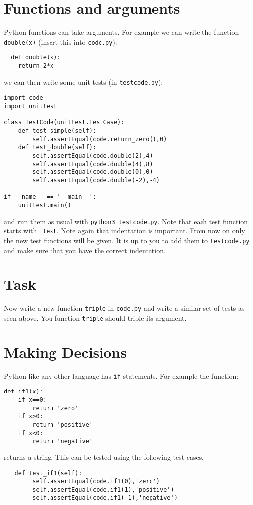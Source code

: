 \documentclass{paper}
\begin{document}
\section*{Functions and arguments}
Python functions can take arguments. For example we can write the
function {\tt double(x)} (insert this into {\tt code.py}):
\begin{lstlisting}
  def double(x):
    return 2*x
\end{lstlisting}
we can then write some unit tests (in {\tt testcode.py}):
\begin{lstlisting}
import code
import unittest

class TestCode(unittest.TestCase):
    def test_simple(self):
        self.assertEqual(code.return_zero(),0)
    def test_double(self):
        self.assertEqual(code.double(2),4)
        self.assertEqual(code.double(4),8)
        self.assertEqual(code.double(0),0)
        self.assertEqual(code.double(-2),-4)

if __name__ == '__main__':
    unittest.main()

  \end{lstlisting} and run them as usual with {\tt python3
    testcode.py}. Note that each test function starts with {\tt
    test}. Note again that indentation is important. From now on only
  the new test functions will be given. It is up to you to add them to
  {\tt testcode.py} and make sure that you have the correct
  indentation.

\section{Task}
Now write a new function {\tt triple} in {\tt code.py} and write a
similar set of tests as seen above. You function {\tt triple} should triple
its argument.

\section*{Making Decisions}
Python like any other language has {\tt if} statements. For example
the function:
\begin{lstlisting}
def if1(x):
    if x==0:
        return 'zero'
    if x>0:
        return 'positive'
    if x<0:
        return 'negative'
\end{lstlisting}
returns a string. This can be tested using the following test cases.
\begin{lstlisting}
   def test_if1(self):
        self.assertEqual(code.if1(0),'zero')
        self.assertEqual(code.if1(1),'positive')
        self.assertEqual(code.if1(-1),'negative')
\end{lstlisting}
\end{document}

